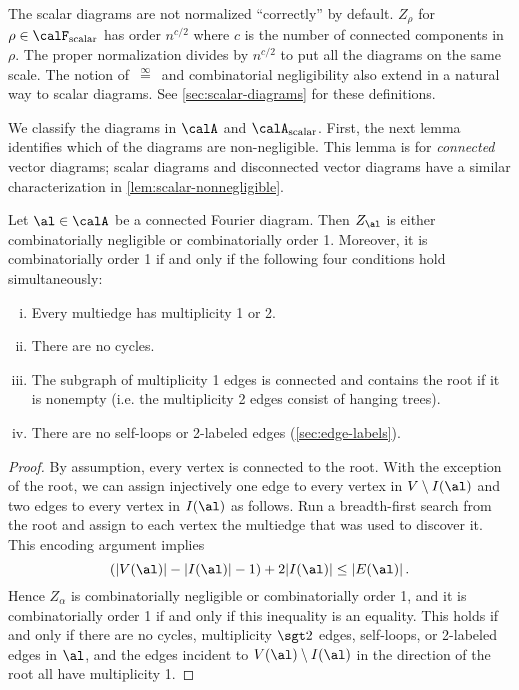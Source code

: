 \documentclass[12pt]{article}
\newcommand{\scalar}{\textnormal{scalar}}
\newcommand{\eqinf}{\,\overset{\infty}{=}\,}
\begin{document}
The scalar diagrams are not normalized
``correctly'' by default.
$Z_\rho$ for $\rho \in \calF_
{\scalar}$ has order $n^{c/2}$ where $c$ is the number
of connected components in $\rho$.
The proper normalization divides by $n^{c/2}$ to put all the diagrams on the same scale.
The notion of $\eqinf$ and combinatorial negligibility also extend in a natural
way to scalar diagrams. See \cref{sec:scalar-diagrams} for these definitions.

We classify the diagrams in $\calA$ and $\calA_\scalar$.
First, the next lemma identifies which of the diagrams are
non-negligible.
This lemma is for \emph{connected} vector diagrams; scalar diagrams
and disconnected
vector diagrams have a similar characterization
in \cref{lem:scalar-nonnegligible}.

\begin{lemma}
\label{lem:connected-nonnegligible}
Let $\al \in \calA$ be a connected Fourier diagram. Then $Z_\al$ is either combinatorially negligible or combinatorially order 1. Moreover, it is combinatorially order 1 if and only if the following four conditions hold simultaneously:
\begin{enumerate}[(i)]
    \item Every multiedge has multiplicity 1 or 2.
    \item There are no cycles.
    \item The subgraph of multiplicity 1 edges is connected and contains the root if it is nonempty (i.e. the multiplicity 2 edges consist of hanging trees).
    \item There are no self-loops or 2-labeled edges (\cref{sec:edge-labels}).
\end{enumerate}
\end{lemma}
\begin{proof}
    By assumption, every vertex is connected to the root. With the exception of the root,
    we can assign injectively one edge to every vertex in $V\setminus I(\al)$
    and two edges to every vertex in $I(\al)$
    as follows.
    Run a breadth-first search from the root and assign to each vertex the multiedge that was used to discover it.
    This encoding argument implies 
    \[
        (|V(\al)|-|I(\al)|-1) + 2|I(\al)| \le |E(\al)|\,.
    \]
    Hence $Z_\alpha$ is combinatorially negligible or combinatorially order 1, and it is combinatorially order 1 if and only if
    this inequality is an equality.
    This holds if and only if
    there are no cycles, multiplicity $\sgt 2$ edges, self-loops, or 2-labeled edges
    in $\al$,
    and the edges incident to $V(\al)\setminus I(\al)$ in the direction of the root
    all have multiplicity 1.
\end{proof}
\end{document}
